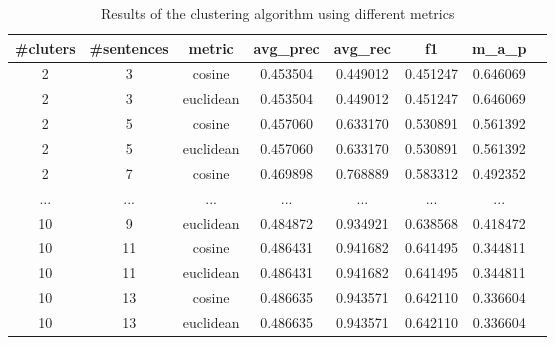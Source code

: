 \begin{table}[H]
  \centering
  \caption{Results of the clustering algorithm using different metrics}
  \label{tab:my-table}
  \begin{tabular}{|c|c|c|c|c|c|c|c|}
    \hline
    \textbf{\#cluters} & \textbf{\#sentences} & \textbf{metric} & \textbf{avg\_prec} & \textbf{avg\_rec} & \textbf{f1} & \textbf{m\_a\_p} \\ \hline
    2                      & 3                              & cosine          & 0.453504                    & 0.449012                 & 0.451247    & 0.646069         \\ \hline
    2                      & 3                              & euclidean       & 0.453504                    & 0.449012                 & 0.451247    & 0.646069         \\ \hline
    2                      & 5                              & cosine          & 0.457060                    & 0.633170                 & 0.530891    & 0.561392         \\ \hline
    2                      & 5                              & euclidean       & 0.457060                    & 0.633170                 & 0.530891    & 0.561392         \\ \hline
    2                      & 7                              & cosine          & 0.469898                    & 0.768889                 & 0.583312    & 0.492352         \\ \hline
    ...                    & ...                            & ...             & ...                         & ...                      & ...         & ...              \\ \hline
    10                     & 9                              & euclidean       & 0.484872                    & 0.934921                 & 0.638568    & 0.418472         \\ \hline
    10                     & 11                             & cosine          & 0.486431                    & 0.941682        
             & 0.641495    & 0.344811         \\ \hline
    10                     & 11                             & euclidean       & 0.486431                    & 0.941682                 & 0.641495    & 0.344811         \\ \hline
    10                     & 13                             & cosine          & 0.486635                    & 0.943571                 & 0.642110    & 0.336604         \\ \hline
    10                     & 13                             & euclidean       & 0.486635                    & 0.943571                 & 0.642110    & 0.336604         \\ \hline
  \end{tabular}
\end{table}

